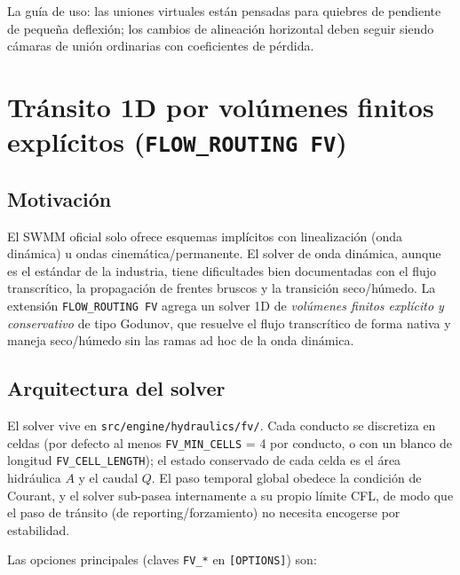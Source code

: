 \documentclass[11pt,a4paper]{article}
\newcommand{\src}[1]{\texttt{src/engine/#1}}
\begin{document}
La guía de uso: las uniones virtuales están pensadas para quiebres de
pendiente de pequeña deflexión; los cambios de alineación horizontal deben
seguir siendo cámaras de unión ordinarias con coeficientes de pérdida.

\section{Tránsito 1D por volúmenes finitos explícitos (\texttt{FLOW\_ROUTING FV})}
\label{sec:fv}

\subsection{Motivación}

El SWMM oficial solo ofrece esquemas implícitos con linealización (onda
dinámica) u ondas cinemática/permanente. El solver de onda dinámica, aunque es
el estándar de la industria, tiene dificultades bien documentadas con el flujo
transcrítico, la propagación de frentes bruscos y la transición seco/húmedo. La
extensión \texttt{FLOW\_ROUTING FV} agrega un solver 1D de \emph{volúmenes
finitos explícito y conservativo} de tipo Godunov, que resuelve el flujo
transcrítico de forma nativa y maneja seco/húmedo sin las ramas ad hoc de la
onda dinámica.

\subsection{Arquitectura del solver}

El solver vive en \src{hydraulics/fv/}. Cada conducto se discretiza en celdas
(por defecto al menos \texttt{FV\_MIN\_CELLS} = 4 por conducto, o con un blanco
de longitud \texttt{FV\_CELL\_LENGTH}); el estado conservado de cada celda es
el área hidráulica $A$ y el caudal $Q$. El paso temporal global obedece la
condición de Courant, y el solver sub-pasea internamente a su propio límite
CFL, de modo que el paso de tránsito (de reporting/forzamiento) no necesita
encogerse por estabilidad.

Las opciones principales (claves \texttt{FV\_*} en \texttt{[OPTIONS]}) son:
\end{document}
